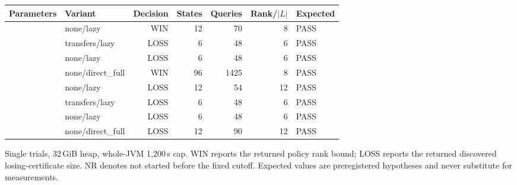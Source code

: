 \begin{longtable}{llrrrrl}
\toprule
Parameters & Variant & Decision & States & Queries & Rank/$|L|$ & Expected \\
\midrule
\endhead
 & none/lazy & WIN & 12 & 70 & 8 & PASS \\
 & transfers/lazy & LOSS & 6 & 48 & 6 & PASS \\
 & none/lazy & LOSS & 6 & 48 & 6 & PASS \\
 & none/direct\_full & WIN & 96 & 1425 & 8 & PASS \\
 & none/lazy & LOSS & 12 & 54 & 12 & PASS \\
 & transfers/lazy & LOSS & 6 & 48 & 6 & PASS \\
 & none/lazy & LOSS & 6 & 48 & 6 & PASS \\
 & none/direct\_full & LOSS & 12 & 90 & 12 & PASS \\
\bottomrule
\end{longtable}
{\par\smallskip\footnotesize Single trials, 32\,GiB heap, whole-JVM 1,200\,s cap. WIN reports the returned policy rank bound; LOSS reports the returned discovered losing-certificate size. NR denotes not started before the fixed cutoff. Expected values are preregistered hypotheses and never substitute for measurements.}
